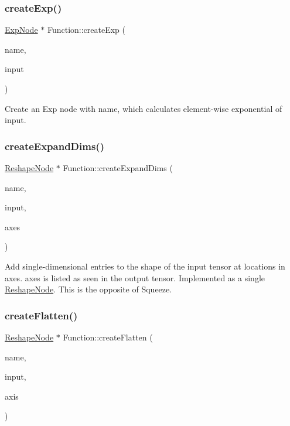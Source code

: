 \subsubsection{\texorpdfstring{create\+Exp()}{createExp()}}
{\footnotesize\ttfamily \hyperlink{classglow_1_1_exp_node}{Exp\+Node} $\ast$ Function\+::create\+Exp (\begin{DoxyParamCaption}\item[{llvm\+::\+String\+Ref}]{name,  }\item[{\hyperlink{structglow_1_1_node_value}{Node\+Value}}]{input }\end{DoxyParamCaption})}

Create an Exp node with {\ttfamily name}, which calculates element-\/wise exponential of {\ttfamily input}. \mbox{\label{classglow_1_1_function_a05272c5de8896a7f0110b620ae8ee3d9}} 
\subsubsection{\texorpdfstring{create\+Expand\+Dims()}{createExpandDims()}}
{\footnotesize\ttfamily \hyperlink{classglow_1_1_reshape_node}{Reshape\+Node} $\ast$ Function\+::create\+Expand\+Dims (\begin{DoxyParamCaption}\item[{llvm\+::\+String\+Ref}]{name,  }\item[{\hyperlink{structglow_1_1_node_value}{Node\+Value}}]{input,  }\item[{llvm\+::\+Array\+Ref$<$ size\+\_\+t $>$}]{axes }\end{DoxyParamCaption})}

Add single-\/dimensional entries to the shape of the {\ttfamily input} tensor at locations in {\ttfamily axes}. {\ttfamily axes} is listed as seen in the output tensor. Implemented as a single \hyperlink{classglow_1_1_reshape_node}{Reshape\+Node}. This is the opposite of Squeeze. \mbox{\label{classglow_1_1_function_a5978750e2f05e9c022756e49e2591830}} 
\subsubsection{\texorpdfstring{create\+Flatten()}{createFlatten()}}
{\footnotesize\ttfamily \hyperlink{classglow_1_1_reshape_node}{Reshape\+Node} $\ast$ Function\+::create\+Flatten (\begin{DoxyParamCaption}\item[{llvm\+::\+String\+Ref}]{name,  }\item[{\hyperlink{structglow_1_1_node_value}{Node\+Value}}]{input,  }\item[{\hyperlink{namespaceglow_a0ca574644e1e42ef193a9947fb4d8911}{unsigned\+\_\+t}}]{axis }\end{DoxyParamCaption})}

